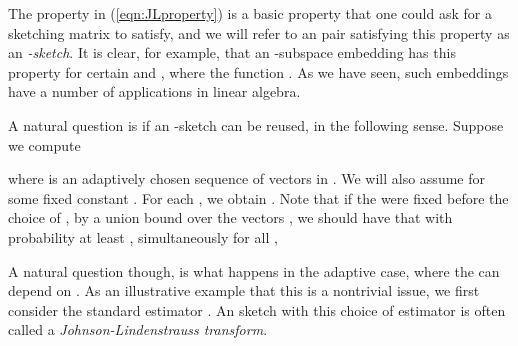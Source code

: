 \documentclass[11pt]{article}
\begin{document}
The property in (\ref{eqn:JLproperty}) is a basic property 
that one could ask for a sketching matrix  to satisfy, and we will refer to an  pair satisfying
this property as 
an {\it -sketch}. It is
clear, for example, that an -subspace embedding has this property for certain  and , 
where the function . As
we have seen, such embeddings have a number of applications in linear algebra. 

A natural question is if an -sketch can be reused, 
in the following sense. Suppose we compute

where  is an adaptively chosen sequence of vectors in . We will also assume
 for some fixed constant .  
For each , we obtain . 
Note that if the  were fixed before the choice of , 
by a union bound over the  vectors ,
we should have that with probability at least , 
simultaneously for all , 

A natural question though, is what happens in the adaptive case, where the  
can depend on . 
As an illustrative example that this is a nontrivial issue, 
we first consider the standard estimator . An  sketch with this choice of
estimator is often called a {\it Johnson-Lindenstrauss transform}. 
\end{document}
